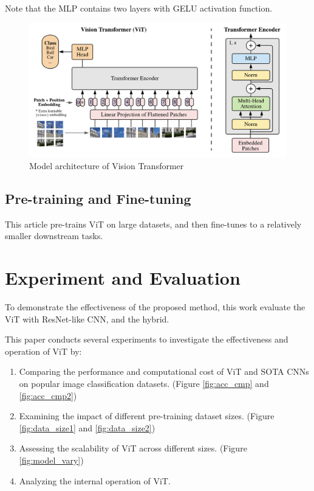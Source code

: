 \documentclass[12pt]{article}
\begin{document}
Note that the MLP contains two layers with GELU activation function.

\begin{figure}
    \centering
    \includegraphics[width=1.0\linewidth]{images/model_arch.png}
    \caption{Model architecture of Vision Transformer \cite{dosovitskiy_image_2021}}
    \label{fig:model_arch}
\end{figure}


\subsection{Pre-training and Fine-tuning}

This article pre-trains ViT on large datasets, and then fine-tunes to a relatively smaller downstream tasks.


\section{Experiment and Evaluation}

To demonstrate the effectiveness of the proposed method, this work evaluate the ViT with ResNet-like CNN, and the hybrid.

This paper conducts several experiments to investigate the effectiveness and operation of ViT by:

\begin{enumerate}
    \item Comparing the performance and computational cost of ViT and SOTA CNNs on popular image classification datasets. (Figure \ref{fig:acc_cmp} and \ref{fig:acc_cmp2})
    \item Examining the impact of different pre-training dataset sizes. (Figure \ref{fig:data_size1} and \ref{fig:data_size2})
    \item Assessing the scalability of ViT across different sizes. (Figure \ref{fig:model_vary})
    \item Analyzing the internal operation of ViT.
\end{enumerate}
\end{document}

